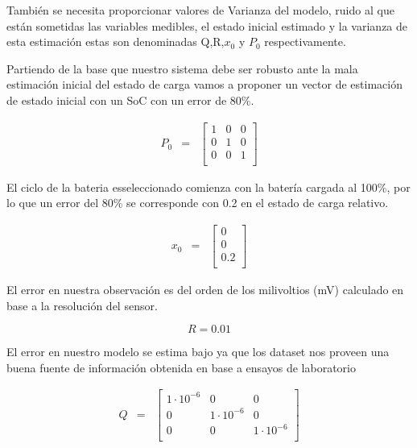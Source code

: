 \documentclass[10pt,a4paper]{article}
\begin{document}
También se necesita proporcionar valores de Varianza del modelo, ruido al que
están sometidas las variables medibles, el estado inicial estimado y la varianza
de esta estimación estas son denominadas Q,R,$x_0$ y $P_0$ respectivamente.

\noindent Partiendo de la base que nuestro sistema debe ser robusto ante la mala
estimación inicial del estado de carga vamos a proponer un vector de estimación
de estado inicial con un SoC con un error de 80\%.

\begin{equation}
    \begin{array}{llll}
	P_0 & = & \begin{bmatrix}
	    1 & 0 & 0 \\
	    0 & 1 & 0 \\
	    0 & 0 & 1 \\
	\end{bmatrix} 
    \end{array} \nonumber
\end{equation}

\noindent El ciclo de la bateria esseleccionado comienza con la batería cargada
al 100\%, por lo que un error del 80\% se corresponde con 0.2 en el estado de
carga relativo.

\begin{equation}
    \begin{array}{llll}
	x_0 & = & \begin{bmatrix}
	    0 \\
	    0 \\
	    0.2 \\
	\end{bmatrix} 
    \end{array} \nonumber
\end{equation}

\noindent El error en nuestra observación es del orden de los milivoltios
(mV) calculado en base a la resolución del sensor.

\begin{equation}
    R = 0.01  \nonumber
\end{equation}

\noindent El error en nuestro modelo se estima bajo ya que los dataset nos 
proveen una buena fuente de información obtenida en base a ensayos de 
laboratorio

\begin{equation}
    \begin{array}{llll}
	Q & = & \begin{bmatrix}
	    1\cdot10^{-6} & 0 & 0 \\
	    0 & 1\cdot10^{-6} & 0 \\
	    0 & 0 & 1\cdot10^{-6} \\
	\end{bmatrix} 
    \end{array} \nonumber
\end{equation}
\end{document}
